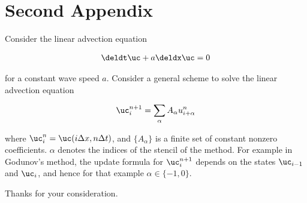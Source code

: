 \chapter{Second Appendix}

Consider the linear advection equation

\begin{align}
 \deldt \uc + a \deldx \uc = 0 \label{eq:app-roe-linear-advection}
\end{align}

for a constant wave speed $a$. Consider a general scheme to solve the linear advection equation

\begin{align}
 \uc_i^{n+1} = \sum_\alpha A_\alpha u_{i+\alpha} ^ n \label{eq:app-roe-general-scheme}
\end{align}

where $\uc_i^n = \uc (i \Delta x, n \Delta t)$, and $\{A_\alpha \}$ is a finite set of constant
nonzero coefficients. $\alpha$ denotes the indices of the stencil of the method. For example in
Godunov's method, the update formula for $\uc_i^{n+1}$ depends on
the states $\uc_{i-1}$ and $\uc_{i}$, and hence for that example $\alpha \in \{-1, 0 \}$.

Thanks for your consideration.


